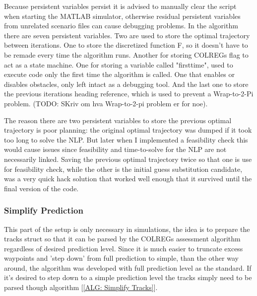 Because persistent variables persist it is advised to manually clear the script when starting the MATLAB simulator, otherwise
residual persistent variables from unrelated scenario files can cause debugging problems. In the algorithm there are seven
persistent variables. Two are used to store the optimal trajectory between iterations. One to store the discretized function F, so it doesn't have to be
remade every time the algorithm runs. Another for storing COLREGs flag to act as a state machine. One for storing a variable called "firsttime", 
used to execute code only the first time the algorithm is called. One that enables or disables obstacles, 
only left intact as a debugging tool. And the last one to store the previous iterations heading reference, which is used to prevent a
Wrap-to-2-Pi problem. (TODO: SKriv om hva Wrap-to-2-pi problem er for noe).

The reason there are two persistent variables to store the previous optimal trajectory is poor planning:
the original optimal trajectory was dumped if it took too long to solve the NLP. 
But later when I implemented a feasibility check this would cause issues since feasibility and time-to-solve for the NLP are not necessarily linked.
Saving the previous optimal trajectory twice so that one is use for feasibility check, while the other is the initial guess substitution candidate,
was a very quick hack solution that worked well enough that it survived until the final version of the code.


\subsubsection*{Simplify Prediction}
This part of the setup is only necessary in simulations, the idea is to prepare the tracks struct so that it can be parsed by the COLREGs assessment algorithm
regardless of desired prediction level. Since it is much easier to truncate excess waypoints and 'step down' from full prediction to simple, than the other way around, the algorithm
was developed with full prediction level as the standard. If it's desired to step down to a simple prediction level the tracks simply need to be parsed though algorithm [\ref{ALG: Simplify Tracks}].

